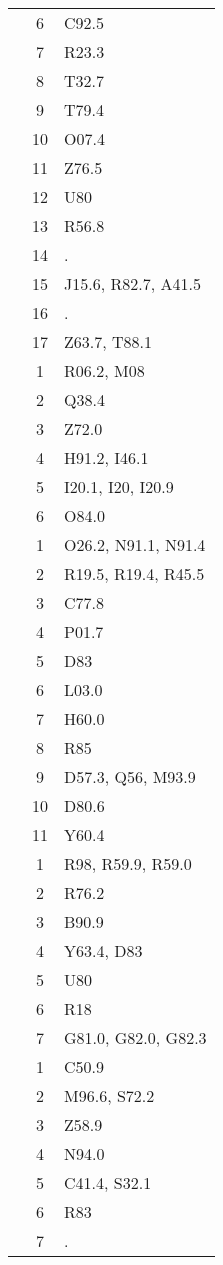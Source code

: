 \begin{table}[htbp]
\begin{tabular}{c c l}
	 & 6 & C92.5 \\
	 & 7 & R23.3 \\
	 & 8 & T32.7 \\
	 & 9 & T79.4 \\
	 & 10 & O07.4 \\
	 & 11 & Z76.5 \\
	 & 12 & U80 \\
	 & 13 & R56.8 \\
	 & 14 & . \\
	 & 15 & J15.6, R82.7, A41.5 \\
	 & 16 & . \\
	 & 17 & Z63.7, T88.1 \\
	\addlinespace
	4 & 1 & R06.2, M08 \\
	 & 2 & Q38.4 \\
	 & 3 & Z72.0 \\
	 & 4 & H91.2, I46.1 \\
	 & 5 & I20.1, I20, I20.9 \\
	 & 6 & O84.0 \\
	\addlinespace
	5 & 1 & O26.2, N91.1, N91.4 \\
	 & 2 & R19.5, R19.4, R45.5 \\
	 & 3 & C77.8 \\
	 & 4 & P01.7 \\
	 & 5 & D83 \\
	 & 6 & L03.0 \\
	 & 7 & H60.0 \\
	 & 8 & R85 \\
	 & 9 & D57.3, Q56, M93.9 \\
	 & 10 & D80.6 \\
	 & 11 & Y60.4 \\
	\addlinespace
	6 & 1 & R98, R59.9, R59.0 \\
	 & 2 & R76.2 \\
	 & 3 & B90.9 \\
	 & 4 & Y63.4, D83 \\
	 & 5 & U80 \\
	 & 6 & R18 \\
	 & 7 & G81.0, G82.0, G82.3 \\
	\addlinespace
	7 & 1 & C50.9 \\
	 & 2 & M96.6, S72.2 \\
	 & 3 & Z58.9 \\
	 & 4 & N94.0 \\
	 & 5 & C41.4, S32.1 \\
	 & 6 & R83 \\
	 & 7 & . \\

\end{tabular}
\end{table}
